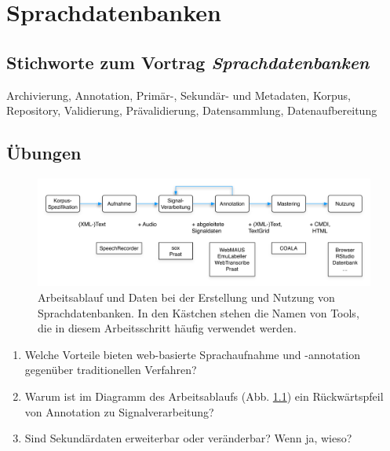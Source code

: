 \documentclass[11pt]{book}
\begin{document}
\chapter{Sprachdatenbanken}

\section{Stichworte zum Vortrag \em{Sprachdatenbanken}}

Archivierung, Annotation, Primär-, Sekundär- und Metadaten, Korpus, Repository, Validierung, Prävalidierung, Datensammlung, Datenaufbereitung

\section{Übungen}

\begin{figure}[htbp]
\begin{center}
\includegraphics[width=1\textwidth]{grafiken/sprachdatenbanken/workflow-de-2}
\caption{Arbeitsablauf und Daten bei der Erstellung und Nutzung von Sprachdatenbanken. In den Kästchen stehen die Namen von Tools, die in diesem Arbeitsschritt häufig verwendet werden.}
\label{fig_sdb_arbeitsablauf}
\end{center}
\end{figure}

\newpage

\begin{enumerate}
\item{Welche Vorteile bieten web-basierte Sprachaufnahme und -annotation gegenüber traditionellen Verfahren?}
\vspace{5cm}
\item{Warum ist im Diagramm des Arbeitsablaufs (Abb. \ref{fig_sdb_arbeitsablauf}) ein Rückwärtspfeil von Annotation zu Signalverarbeitung?}
\vspace{5cm}
\item{Sind Sekundärdaten erweiterbar oder veränderbar? Wenn ja, wieso?}
\vspace{5cm}
\end{enumerate}
\end{document}
